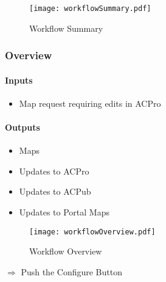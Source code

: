 \begin{figure}[h!]
\centering
    \texttt{[image: workflowSummary.pdf]}

\caption{Workflow Summary}
\end{figure}
 \clearpage
\subsubsection{Overview}

\begin{adjmulticols}{2}{\innerMar}{\outerMar}
\paragraph{Inputs}
\begin{itemize} %
\item Map request requiring edits in ACPro
\end{itemize} %
\columnbreak
\paragraph{Outputs}
\begin{itemize} %
\setlength\itemsep{1pt}
\item Maps
\item Updates to ACPro
\item Updates to ACPub
\item Updates to Portal Maps
\end{itemize} %
\noindent
\end{adjmulticols}

\begin{figure}[h!]
\centering
    \texttt{[image: workflowOverview.pdf]}

\caption{Workflow Overview}
\end{figure}
%
\clearpage


\clearpage
{\Large $\Rightarrow$ Push the Configure Button}



